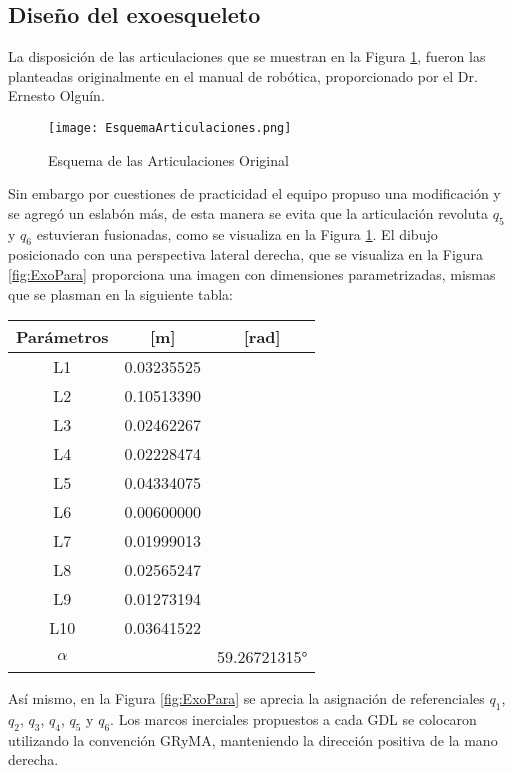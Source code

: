 \documentclass[journal]{IEEEtran}
\begin{document}
    \subsection{Diseño del exoesqueleto}
    \noindent La disposición de las articulaciones que se muestran en la Figura \ref{fig:EsqArtOri}, fueron las planteadas
    originalmente en el manual de robótica, proporcionado por el Dr. Ernesto Olguín.

    \begin{figure}[H]
        \centering
        \texttt{[image: EsquemaArticulaciones.png]} 
        \caption{Esquema de las Articulaciones Original}
        \label{fig:EsqArtOri}
    \end{figure}
    \noindent Sin embargo por cuestiones de practicidad el equipo propuso una modificación y se agregó un eslabón más, de
    esta manera se evita que la articulación revoluta  $q_5$ y  $q_6$ estuvieran fusionadas, como se visualiza en la 
    Figura \ref{fig:EsqArtOri}. El dibujo posicionado con una perspectiva lateral derecha, que se visualiza en la Figura 
    \ref{fig:ExoPara} proporciona una imagen con dimensiones parametrizadas, mismas que se plasman en la siguiente tabla: 

    \begin{table}[!ht] %
        \centering
        \begin{center}
            \begin{tabular}{ccc}
                Parámetros & [m] & [rad] \\
                \hline \hline 
                L1 & 0.03235525 & \\ 
                L2 & 0.10513390 & \\
                L3 & 0.02462267 & \\
                L4 & 0.02228474 & \\
                L5 & 0.04334075 & \\
                L6 & 0.00600000 & \\
                L7 & 0.01999013 & \\
                L8 & 0.02565247 & \\
                L9 & 0.01273194 & \\
                L10 & 0.03641522 & \\
                $\alpha$ &  & 59.26721315°\\
            \end{tabular}
        \end{center}
    \end{table}
    Así mismo, en la Figura \ref{fig:ExoPara} se aprecia la asignación de referenciales $q_1$, $q_2$, $q_3$, $q_4$, $q_5$
    y $q_6$. Los marcos inerciales propuestos a cada GDL se colocaron utilizando la convención GRyMA, manteniendo la
    dirección positiva de la mano derecha.
        
\end{document}
